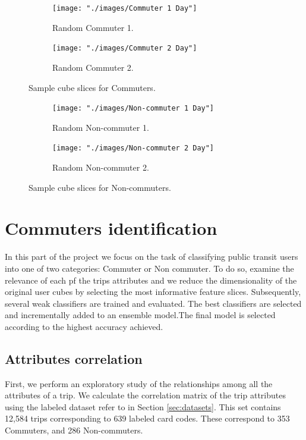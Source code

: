 \documentclass{article}
\begin{document}
\begin{figure}[H]
  \centering
  \begin{subfigure}[b]{.45\textwidth}
  	\centering
	\texttt{[image: "./images/Commuter 1 Day"]}
  	\caption{Random Commuter 1.}
  \end{subfigure}
  \begin{subfigure}[b]{.45\textwidth}
  	\centering
	\texttt{[image: "./images/Commuter 2 Day"]}
  	\caption{Random Commuter 2.}
  \end{subfigure}
  \caption{Sample cube slices for Commuters.}
  	\label{fig:preprocessing/cubesCom} 
\end{figure}

\begin{figure}[H]
  \centering
  \begin{subfigure}[b]{.45\textwidth}
  	\centering
	\texttt{[image: "./images/Non-commuter 1 Day"]}
  	\caption{Random Non-commuter 1.}
  \end{subfigure}
  \begin{subfigure}[b]{.45\textwidth}
  	\centering
	\texttt{[image: "./images/Non-commuter 2 Day"]}
  	\caption{Random Non-commuter 2.}
  \end{subfigure}
  \caption{Sample cube slices for Non-commuters.}
  	\label{fig:preprocessing/cubesNonCom} 
\end{figure}

\newpage
\section{Commuters identification}
\label{sec:partII}
In this part of the project we focus on the task of classifying public transit users into one of two categories: Commuter or Non commuter. To do so, examine the relevance of each pf the trips attributes and we reduce the dimensionality of the original user cubes by selecting the most informative feature slices. Subsequently, several weak classifiers are trained and evaluated. The best classifiers are selected and incrementally added to an ensemble model.The final model is selected according to the highest accuracy achieved.

\subsection{Attributes correlation} 
First, we perform an exploratory study of the relationships among all the attributes of a trip. We calculate the correlation matrix of the trip attributes using the labeled dataset refer to in Section \ref{sec:datasets}. This set contains 12,584 trips corresponding to 639 labeled card codes. These correspond to 353 Commuters, and 286 Non-commuters. 
\end{document}
